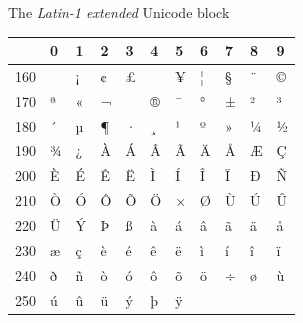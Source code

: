 \documentclass[a4paper]{article}
\newlength{\DUtablewidth} %
\providecommand*{\DUroletitlereference}[1]{\textsl{#1}}
\begin{document}
The \DUroletitlereference{Latin-1 extended} Unicode block

\leavevmode
\setlength{\DUtablewidth}{\linewidth}
\begin{longtable}[c]{|p{0.051\DUtablewidth}|p{0.028\DUtablewidth}|p{0.028\DUtablewidth}|p{0.028\DUtablewidth}|p{0.028\DUtablewidth}|p{0.028\DUtablewidth}|p{0.028\DUtablewidth}|p{0.028\DUtablewidth}|p{0.028\DUtablewidth}|p{0.028\DUtablewidth}|p{0.028\DUtablewidth}|}
\hline

% 
 & 
0
 & 
1
 & 
2
 & 
3
 & 
4
 & 
5
 & 
6
 & 
7
 & 
8
 & 
9
 \\
\hline

160
 &  & 
¡
 & 
¢
 & 
£
 &  & 
¥
 & 
¦
 & 
§
 & 
¨
 & 
©
 \\
\hline

170
 & 
ª
 & 
«
 & 
¬
 & 
\-
 & 
®
 & 
¯
 & 
°
 & 
±
 & 
²
 & 
³
 \\
\hline

180
 & 
´
 & 
µ
 & 
¶
 & 
·
 & 
¸
 & 
¹
 & 
º
 & 
»
 & 
¼
 & 
½
 \\
\hline

190
 & 
¾
 & 
¿
 & 
À
 & 
Á
 & 
Â
 & 
Ã
 & 
Ä
 & 
Å
 & 
Æ
 & 
Ç
 \\
\hline

200
 & 
È
 & 
É
 & 
Ê
 & 
Ë
 & 
Ì
 & 
Í
 & 
Î
 & 
Ï
 & 
Ð
 & 
Ñ
 \\
\hline

210
 & 
Ò
 & 
Ó
 & 
Ô
 & 
Õ
 & 
Ö
 & 
×
 & 
Ø
 & 
Ù
 & 
Ú
 & 
Û
 \\
\hline

220
 & 
Ü
 & 
Ý
 & 
Þ
 & 
ß
 & 
à
 & 
á
 & 
â
 & 
ã
 & 
ä
 & 
å
 \\
\hline

230
 & 
æ
 & 
ç
 & 
è
 & 
é
 & 
ê
 & 
ë
 & 
ì
 & 
í
 & 
î
 & 
ï
 \\
\hline

240
 & 
ð
 & 
ñ
 & 
ò
 & 
ó
 & 
ô
 & 
õ
 & 
ö
 & 
÷
 & 
ø
 & 
ù
 \\
\hline

250
 & 
ú
 & 
û
 & 
ü
 & 
ý
 & 
þ
 & 
ÿ
 &  &  &  &  \\
\hline
\end{longtable}
%
\end{document}
